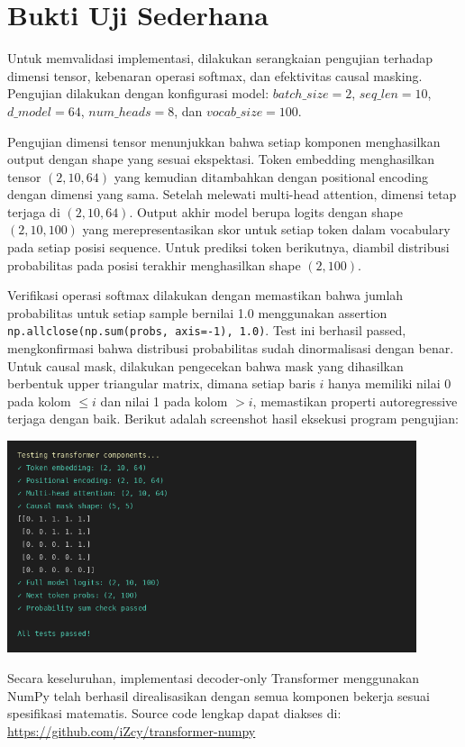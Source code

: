\documentclass[11pt,a4paper]{article}
\begin{document}
\section{Bukti Uji Sederhana}

Untuk memvalidasi implementasi, dilakukan serangkaian pengujian terhadap dimensi tensor, kebenaran operasi softmax, dan efektivitas causal masking. Pengujian dilakukan dengan konfigurasi model: $batch\_size=2$, $seq\_len=10$, $d\_model=64$, $num\_heads=8$, dan $vocab\_size=100$.

Pengujian dimensi tensor menunjukkan bahwa setiap komponen menghasilkan output dengan shape yang sesuai ekspektasi. Token embedding menghasilkan tensor $(2, 10, 64)$ yang kemudian ditambahkan dengan positional encoding dengan dimensi yang sama. Setelah melewati multi-head attention, dimensi tetap terjaga di $(2, 10, 64)$. Output akhir model berupa logits dengan shape $(2, 10, 100)$ yang merepresentasikan skor untuk setiap token dalam vocabulary pada setiap posisi sequence. Untuk prediksi token berikutnya, diambil distribusi probabilitas pada posisi terakhir menghasilkan shape $(2, 100)$.

Verifikasi operasi softmax dilakukan dengan memastikan bahwa jumlah probabilitas untuk setiap sample bernilai 1.0 menggunakan assertion \texttt{np.allclose(np.sum(probs, axis=-1), 1.0)}. Test ini berhasil passed, mengkonfirmasi bahwa distribusi probabilitas sudah dinormalisasi dengan benar. Untuk causal mask, dilakukan pengecekan bahwa mask yang dihasilkan berbentuk upper triangular matrix, dimana setiap baris $i$ hanya memiliki nilai 0 pada kolom $\leq i$ dan nilai 1 pada kolom $> i$, memastikan properti autoregressive terjaga dengan baik. Berikut adalah screenshot hasil eksekusi program pengujian:

\begin{center}
\includegraphics[width=0.9\textwidth]{test_screenshot.png}
\end{center}

Secara keseluruhan, implementasi decoder-only Transformer menggunakan NumPy telah berhasil direalisasikan dengan semua komponen bekerja sesuai spesifikasi matematis. Source code lengkap dapat diakses di: \url{https://github.com/iZcy/transformer-numpy}
\end{document}
